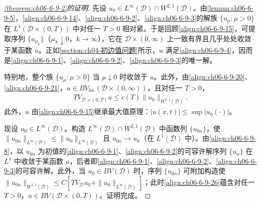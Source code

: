 \documentclass[../../main.tex]{subfiles}
\begin{document}
\begin{proof}[\cref{theorem:ch06-6-9-2}的证明]
先设 $u_{0}\in L^{\infty}(\mathscr{D})\cap W^{2,1}(\mathscr{D})$。由\cref{lemma:ch06-6-9-5}，\eqref{align:ch06-6-9-14}、\eqref{align:ch06-6-9-2}、\eqref{align:ch06-6-9-3}的解族 $\{u_{\mu}:\mu>0\}$ 在 $L^{1}(\mathscr{D}\times(0,T))$ 中对任一 $T>0$ 相对紧。于是回顾\eqref{align:ch06-6-9-15}，可提取序列 $\{u_{\mu_{k}}\}$（$\mu_{k}\downarrow 0$，$k\to\infty$），它在 $\mathscr{D}\times(0,\infty)$ 上一致有界且几乎处处收敛于某函数 $u$。正如\cref{section:ch04-初边值问题}所示，$u$ 满足\eqref{align:ch06-6-9-4}，因而是\eqref{align:ch06-6-9-1}、\eqref{align:ch06-6-9-2}、\eqref{align:ch06-6-9-3}的唯一解。

特别地，整个族 $\{u_{\mu}:\mu>0\}$ 当 $\mu\downarrow 0$ 时收敛于 $u$。此外，由\eqref{align:ch06-6-9-20}、\eqref{align:ch06-6-9-21}，$u\in BV_{\mathrm{loc}}(\mathscr{D}\times(0,\infty))$，且对任一 $T>0$，
\begin{align}
TV_{\mathscr{D}\times(0,T)}u\leqslant c(T)\|u_{0}\|_{W^{1,1}(\mathscr{D})}.
\label{align:ch06-6-9-26}
\end{align}
此外，$u$ 由\eqref{align:ch06-6-9-15}继承最大值原理：$|u(x,t)|\leqslant\sup|u_{0}(\cdot)|$。

现设 $u_{0}\in L^{\infty}(\mathscr{D})$。构造 $L^{\infty}(\mathscr{D})\cap W^{2,1}(\mathscr{D})$ 中函数列 $\{u_{0n}\}$，使 $\|u_{0n}\|_{L^{\infty}(\mathscr{D})}\leqslant\|u_{0}\|_{L^{\infty}(\mathscr{D})}$ 且 $u_{0n}\to u_{0}$（在 $L^{1}(\mathscr{D})$ 中）。由\eqref{align:ch06-6-9-8}，以 $u_{0n}$ 为初值的\eqref{align:ch06-6-9-1}、\eqref{align:ch06-6-9-2}的可容许解序列 $\{u_{n}\}$ 在 $L^{1}$ 中收敛于某函数 $u$，后者即\eqref{align:ch06-6-9-1}、\eqref{align:ch06-6-9-2}、\eqref{align:ch06-6-9-3}的可容许解。此外，当 $u_{0}\in BV(\mathscr{D})$ 时，序列 $\{u_{0n}\}$ 可附加构造使 $\|u_{0n}\|_{W^{1,1}(\mathscr{D})}\leqslant C[TV_{\mathscr{D}}u_{0}+\|u_{0}\|_{L^{\infty}(\mathscr{D})}]$；此时\eqref{align:ch06-6-9-26}蕴含对任一 $T>0$，$u\in BV(\mathscr{D}\times(0,T))$。证明完成。
\end{proof}
\end{document}
